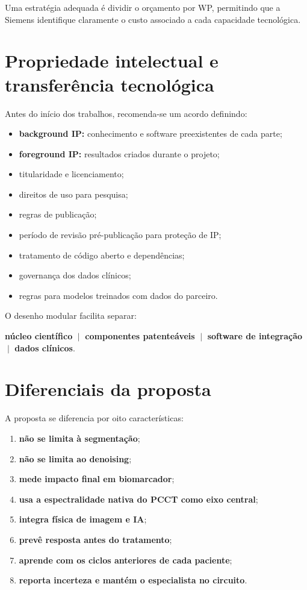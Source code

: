 \documentclass[11pt,a4paper]{article}
\begin{document}
Uma estratégia adequada é dividir o orçamento por WP, permitindo que a Siemens identifique claramente o custo associado a cada capacidade tecnológica.

\section{Propriedade intelectual e transferência tecnológica}

Antes do início dos trabalhos, recomenda-se um acordo definindo:

\begin{itemize}
\item \textbf{background IP:} conhecimento e software preexistentes de cada parte;
\item \textbf{foreground IP:} resultados criados durante o projeto;
\item titularidade e licenciamento;
\item direitos de uso para pesquisa;
\item regras de publicação;
\item período de revisão pré-publicação para proteção de IP;
\item tratamento de código aberto e dependências;
\item governança dos dados clínicos;
\item regras para modelos treinados com dados do parceiro.
\end{itemize}

O desenho modular facilita separar:
\begin{center}
\textbf{núcleo científico} $\;|\;$ \textbf{componentes patenteáveis} $\;|\;$ \textbf{software de integração} $\;|\;$ \textbf{dados clínicos}.
\end{center}

\section{Diferenciais da proposta}

A proposta se diferencia por oito características:

\begin{enumerate}
\item \textbf{não se limita à segmentação};
\item \textbf{não se limita ao denoising};
\item \textbf{mede impacto final em biomarcador};
\item \textbf{usa a espectralidade nativa do PCCT como eixo central};
\item \textbf{integra física de imagem e IA};
\item \textbf{prevê resposta antes do tratamento};
\item \textbf{aprende com os ciclos anteriores de cada paciente};
\item \textbf{reporta incerteza e mantém o especialista no circuito}.
\end{enumerate}
\end{document}
